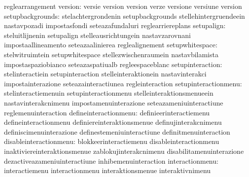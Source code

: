                                   reglearrangement
                         version: versie                           version
                                  version                          verze
                                  versione                         versiune
                                  version
                setupbackgrounds: stelachtergrondenin              setupbackgrounds
                                  stellehintergruendeein           nastavpozadi
                                  impostasfondi                    seteazafundaluri
                                  reglearriereplans
                      setupalign: steluitlijnenin                  setupalign
                                  stelleausrichtungein             nastavzarovnani
                                  impostaallineamento              seteazaalinierea
                                  reglealignement
                 setupwhitespace: stelwitruimtein                  setupwhitespace
                                  stellezwischenraumein            nastavbilamista
                                  impostaspaziobianco              seteazaspatiualb
                                  regleespaceblanc
                setupinteraction: stelinteractiein                 setupinteraction
                                  stelleinteraktionein             nastavinterakci
                                  impostainterazione               seteazainteractiunea
                                  regleinteraction
            setupinteractionmenu: stelinteractiemenuin             setupinteractionmenu
                                  stelleinteraktionsmenueein       nastavinterakcnimenu
                                  impostamenuinterazione           seteazameniuinteractiune
                                  reglemenuinteraction
           defineinteractionmenu: definieerinteractiemenu          defineinteractionmenu
                                  definiereinteraktionsmenue       definujinterakcnimenu
                                  definiscimenuinterazione         definestemeniuinteractiune
                                  definitmenuinteraction
          disableinteractionmenu: blokkeerinteractiemenu           disableinteractionmenu
                                  inaktiviereinteraktionsmenue     zablokujinterakcnimenu
                                  disabilitamenuinterazione        dezactiveazameniuinteractiune
                                  inhibemenuinteraction
                 interactionmenu: interactiemenu                   interactionmenu
                                  interaktionsmenue                interaktivnimenu
